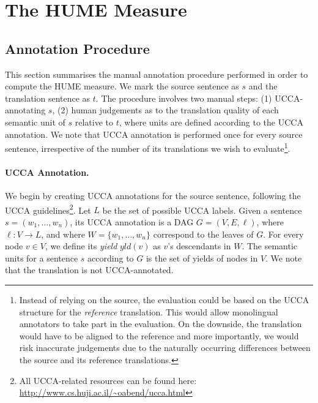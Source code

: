 \documentclass[11pt]{article}
\begin{document}


\section{The HUME Measure}\label{sec:hume}


\subsection{Annotation Procedure}\label{sec:guidelines}

This section summarises the manual annotation procedure performed in order 
to compute the HUME measure. 
We mark the source sentence as $s$ and the translation sentence as $t$. 
The procedure involves two manual steps: (1) UCCA-annotating $s$, 
(2) human judgements as to the translation quality of each semantic unit of $s$ relative to $t$,
where units are defined according to the UCCA annotation.
We note that UCCA annotation is performed once for every source sentence,
irrespective of the number of its translations we wish
to evaluate\footnote{Instead of relying on the source,
the evaluation could be based on the UCCA structure for the \emph{reference}
translation. This would allow monolingual annotators to take part in the
evaluation. On the downside, the translation would have to be aligned to the
reference and more importantly, we would risk inaccurate judgements due to
the naturally occurring differences between the source and its reference
translations.}.

\paragraph{UCCA Annotation.}
We begin by creating UCCA annotations for the source sentence, following the
UCCA guidelines\footnote{All UCCA-related resources can be found
  here: \url{http://www.cs.huji.ac.il/~oabend/ucca.html}}.
Let $L$ be the set of possible UCCA labels.
Given a sentence $s = (w_1, \ldots,w_n)$, its UCCA annotation is a DAG $G=(V,E,\ell)$,
where $\ell: V \rightarrow L$, and where $W = \{w_1,\ldots,w_n\}$ correspond to the leaves of $G$.
For every node $v \in V$, we define its {\it yield} $yld(v)$ as $v$'s descendants in $W$.
The semantic units for a sentence $s$ according to $G$
is the set of yields of nodes in $V$. 
We note that the translation is not UCCA-annotated.
\end{document}
